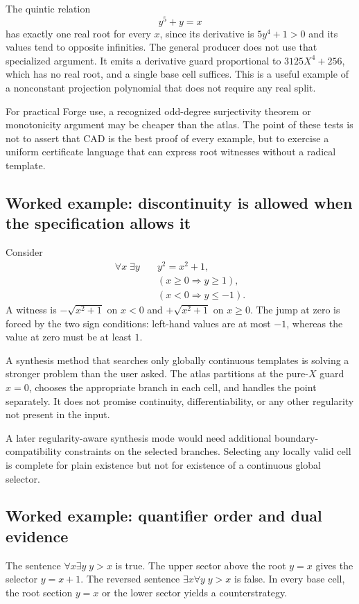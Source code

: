 The quintic relation
\[
 y^5+y=x
\]
has exactly one real root for every $x$, since its derivative is $5y^4+1>0$ and its values tend to opposite infinities. The general producer does not use that specialized argument. It emits a derivative guard proportional to $3125X^4+256$, which has no real root, and a single base cell suffices. This is a useful example of a nonconstant projection polynomial that does not require any real split.

For practical Forge use, a recognized odd-degree surjectivity theorem or monotonicity argument may be cheaper than the atlas. The point of these tests is not to assert that CAD is the best proof of every example, but to exercise a uniform certificate language that can express root witnesses without a radical template.

\subsection{Worked example: discontinuity is allowed when the specification allows it}
Consider
\[
 \begin{aligned}
 \forall x\;\exists y\quad & y^2=x^2+1,\\
 & (x\geq0\Longrightarrow y\geq1),\\
 & (x<0\Longrightarrow y\leq-1).
 \end{aligned}
\]
A witness is $-\sqrt{x^2+1}$ on $x<0$ and $+\sqrt{x^2+1}$ on $x\geq0$. The jump at zero is forced by the two sign conditions: left-hand values are at most $-1$, whereas the value at zero must be at least $1$.

A synthesis method that searches only globally continuous templates is solving a stronger problem than the user asked. The atlas partitions at the pure-$X$ guard $x=0$, chooses the appropriate branch in each cell, and handles the point separately. It does not promise continuity, differentiability, or any other regularity not present in the input.

A later regularity-aware synthesis mode would need additional boundary-compatibility constraints on the selected branches. Selecting any locally valid cell is complete for plain existence but not for existence of a continuous global selector.

\subsection{Worked example: quantifier order and dual evidence}
The sentence $\forall x\exists y\;y>x$ is true. The upper sector above the root $y=x$ gives the selector $y=x+1$. The reversed sentence $\exists x\forall y\;y>x$ is false. In every base cell, the root section $y=x$ or the lower sector yields a counterstrategy.

